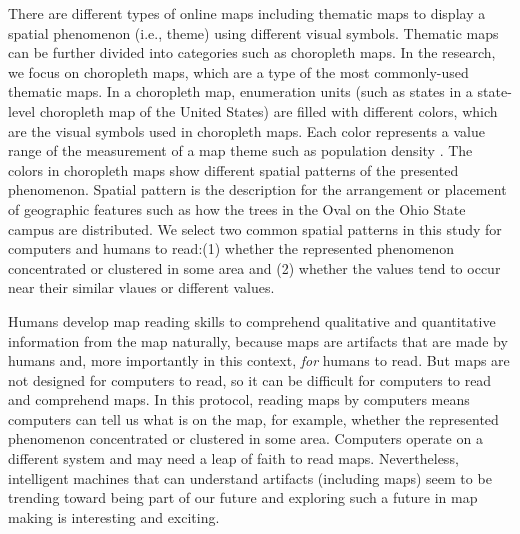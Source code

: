 There are different types of online maps including thematic maps to display a spatial phenomenon (i.e., theme) using different visual symbols. Thematic maps can be further divided into categories such as choropleth maps. In the research, we focus on choropleth maps, which are a type of the most commonly-used thematic maps. In a choropleth map, enumeration units (such as states in a state-level choropleth map of the United States) are filled with different colors, which are the visual symbols used in choropleth maps. Each color represents a value range of the measurement of a map theme such as population density \citep{slocum2009thematic}. The colors in choropleth maps show different spatial patterns of the presented phenomenon. Spatial pattern is the description for the arrangement or placement of geographic features \citep{kimerling2016map} such as how the trees in the Oval on the Ohio State campus are distributed. We select two common spatial patterns in this study for computers and humans to read:(1) whether the represented phenomenon concentrated or clustered in some area and (2) whether the values tend to occur near their similar vlaues or different values. 

Humans develop map reading skills \citep{presson1982development,gilhooly1988skill} to comprehend qualitative and quantitative information from the map naturally, because maps are artifacts that are made by humans and, more importantly in this context, {\it for} humans to read. But maps are not designed for computers to read, so it can be difficult for computers to read and comprehend maps. In this protocol, reading maps by computers means computers can tell us what is on the map, for example, whether the represented phenomenon concentrated or clustered in some area. Computers operate on a different system and may need a leap of faith to read maps. Nevertheless, intelligent machines that can understand artifacts (including maps) seem to be trending toward being part of our future \citep{cascio2016technology} and exploring such a future in map making is interesting and exciting. 

